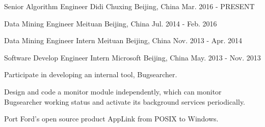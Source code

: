 

\begin{cventries}

  \cventry
    {Senior Algorithm Engineer}
    {Didi Chuxing}
    {Beijing, China}
    {Mar. 2016 - PRESENT}
    {
      \begin{cvitems}
        \item {}
      \end{cvitems}
    }

  \cventry
    {Data Mining Engineer}
    {Meituan}
    {Beijing, China}
    {Jul. 2014 - Feb. 2016}
    {
      \begin{cvitems}
        \item {}
      \end{cvitems}
    }

  \cventry
    {Data Mining Engineer Intern}
    {Meituan}
    {Beijing, China}
    {Nov. 2013 - Apr. 2014}
    {
      \begin{cvitems}
        \item {}
      \end{cvitems}
    }

  \cventry
    {Software Develop Engineer Intern}
    {Microsoft}
    {Beijing, China}
    {May. 2013 - Nov. 2013}
    {
      \begin{cvitems}
        \item {Participate in developing an internal tool, Bugsearcher.}
        \item {Design and code a monitor module independently, which can monitor Bugsearcher working status and activate its background services periodically.} 
        \item {Port Ford’s open source product AppLink from POSIX to Windows.}
      \end{cvitems}
    }

\end{cventries}
